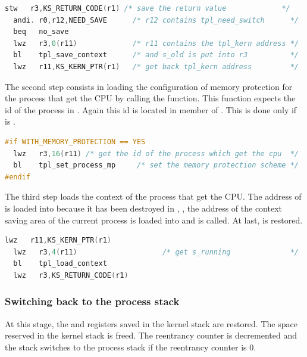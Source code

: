 \begin{lstlisting}[language=C]
  stw   r3,KS_RETURN_CODE(r1) /* save the return value             */
  andi. r0,r12,NEED_SAVE      /* r12 contains tpl_need_switch      */
  beq   no_save
  lwz   r3,0(r11)             /* r11 contains the tpl_kern address */
  bl    tpl_save_context      /* and s_old is put into r3          */
  lwz   r11,KS_KERN_PTR(r1)   /* get back tpl_kern address         */
\end{lstlisting}

The second step consists in loading the configuration of memory protection for the process that get the CPU by calling the  function. This function expects the id of the process in . Again this id is located in member  of . This is done only if  is \YES. 

\begin{lstlisting}[language=C]
#if WITH_MEMORY_PROTECTION == YES
  lwz   r3,16(r11) /* get the id of the process which get the cpu  */
  bl    tpl_set_process_mp     /* set the memory protection scheme */
#endif
\end{lstlisting}

The third step loads the context of the process that get the CPU. The address of  is loaded into  because it has been destroyed in , , the address of the context saving area of the current process is loaded into  and  is called. At last,  is restored.

\begin{lstlisting}[language=C]
  lwz   r11,KS_KERN_PTR(r1)
  lwz   r3,4(r11)                    /* get s_running              */
  bl    tpl_load_context
  lwz   r3,KS_RETURN_CODE(r1)
\end{lstlisting}

\subsubsection{Switching back to the process stack}

At this stage, the  and  registers saved in the kernel stack are restored. The space reserved in the kernel stack is freed. The reentrancy counter is decremented and the stack switches to the process stack if the reentrancy counter is 0.

